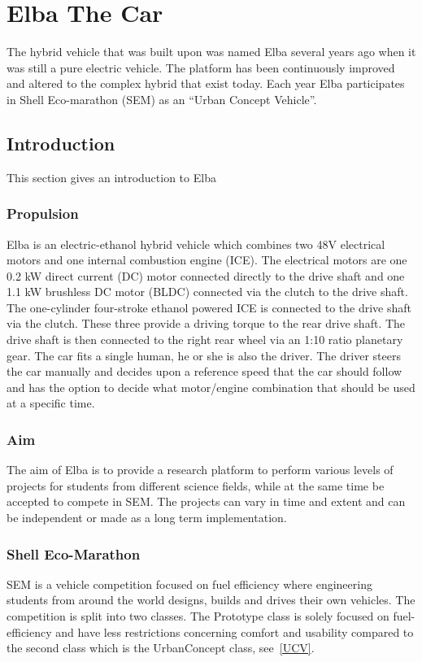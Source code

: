 \chapter{Elba The Car}
The hybrid vehicle that was built upon was named Elba several years ago when it
was still a pure electric vehicle. The platform has been continuously improved
and altered to the complex hybrid that exist today. Each year Elba participates
in Shell Eco-marathon (SEM) as an ``Urban Concept Vehicle''.

\section{Introduction}
This section gives an introduction to Elba
\subsection{Propulsion}
Elba is an electric-ethanol hybrid vehicle which combines two 48V electrical
motors and one internal combustion engine (ICE). The electrical motors are one
0.2 kW direct current (DC) motor connected directly to the drive shaft and one
1.1 kW brushless DC motor (BLDC) connected via the clutch to the drive shaft.
The one-cylinder four-stroke ethanol powered ICE is connected to the drive
shaft via the clutch. These three provide a driving torque to the rear drive
shaft. The drive shaft is then connected to the right rear wheel via an 1:10
ratio planetary gear. The car fits a single human, he or she is also the
driver. The driver steers the car manually and decides upon a reference speed
that the car should follow and has the option to decide what motor/engine
combination that should be used at a specific time.

\subsection{Aim}
The aim of Elba is to provide a research platform to perform various levels of
projects for students from different science fields, while at the same time be
accepted to compete in SEM\@. The projects can vary in time and
extent and can be independent or made as a long term implementation.

\subsection{Shell Eco-Marathon}
SEM is a vehicle competition focused on fuel efficiency where engineering
students from around the world designs, builds and drives their own vehicles.
The competition is split into two classes. The Prototype class is solely
focused on fuel-efficiency and have less restrictions concerning comfort and
usability compared to the second class which is the UrbanConcept class,
see~\ref{UCV}.

